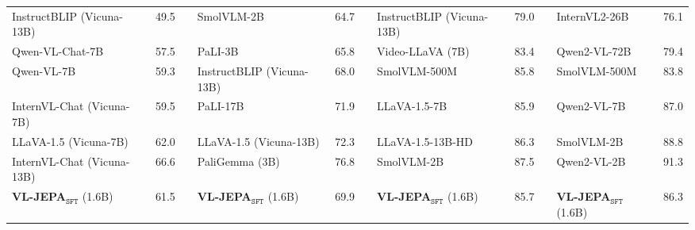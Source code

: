 \begin{table}[h!]
{\begin{tabular}{lr c lr c lr c lr}
InstructBLIP (Vicuna-13B) & {\color[HTML]{980000} 49.5} & & 
SmolVLM-2B & {\color[HTML]{980000} 64.7} & & 
InstructBLIP (Vicuna-13B) & {\color[HTML]{980000} 79.0} & & 
InternVL2-26B & {\color[HTML]{980000} 76.1} \\

Qwen-VL-Chat-7B & {\color[HTML]{980000} 57.5} & & 
PaLI-3B & {\color[HTML]{980000} 65.8} & & 
Video-LLaVA (7B) & {\color[HTML]{980000} 83.4} & & 
Qwen2-VL-72B & {\color[HTML]{980000} 79.4} \\

Qwen-VL-7B & {\color[HTML]{980000} 59.3} & & 
InstructBLIP (Vicuna-13B) & {\color[HTML]{980000} 68.0} & & 
SmolVLM-500M & 85.8 & & 
SmolVLM-500M & {\color[HTML]{980000} 83.8} \\

InternVL-Chat (Vicuna-7B) & {\color[HTML]{980000} 59.5} & & 
PaLI-17B & 71.9 & & 
LLaVA-1.5-7B & 85.9 & & 
Qwen2-VL-7B & 87.0 \\

LLaVA-1.5 (Vicuna-7B) & 62.0 & & 
LLaVA-1.5 (Vicuna-13B) & 72.3 & & 
LLaVA-1.5-13B-HD & 86.3 & & 
SmolVLM-2B & 88.8 \\

InternVL-Chat (Vicuna-13B) & 66.6 & & 
PaliGemma (3B) & 76.8 & & 
SmolVLM-2B & 87.5 & & 
Qwen2-VL-2B & 91.3 \\

\cmidrule{1-2} \cmidrule{4-5} \cmidrule{7-8} \cmidrule{10-11}

\cellcolor[HTML]{EBF3FF}\textbf{VL-JEPA$_\texttt{SFT}$} (1.6B) & \cellcolor[HTML]{EBF3FF}61.5 & & 
\cellcolor[HTML]{EBF3FF}\textbf{VL-JEPA$_\texttt{SFT}$} (1.6B) & \cellcolor[HTML]{EBF3FF}69.9 & & 
\cellcolor[HTML]{EBF3FF}\textbf{VL-JEPA$_\texttt{SFT}$} (1.6B) & \cellcolor[HTML]{EBF3FF}85.7 & & 
\cellcolor[HTML]{EBF3FF}\textbf{VL-JEPA$_\texttt{SFT}$} (1.6B) & \cellcolor[HTML]{EBF3FF}86.3 \\

\cmidrule{1-2} \cmidrule{4-5} \cmidrule{7-8} \cmidrule{10-11}

\end{tabular}%
}
\end{table}
 



